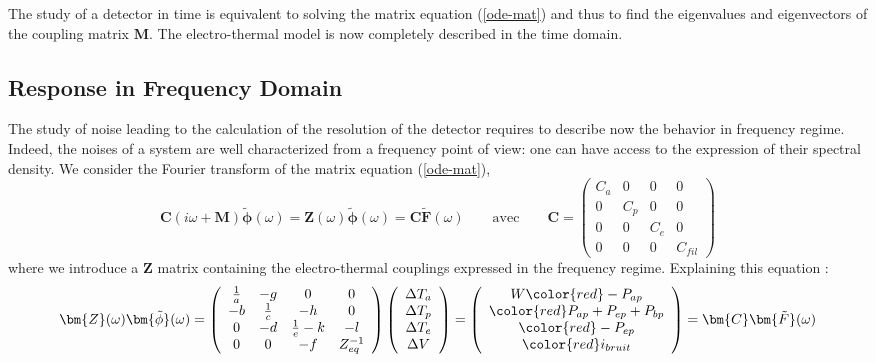 The study of a detector in time is equivalent to solving the matrix equation (\ref{ode-mat}) and thus to find the eigenvalues and eigenvectors of the coupling matrix $\bm{M}$. The electro-thermal model is now completely described in the time domain.


\subsection{Response in Frequency Domain}
\label{omega}

The study of noise leading to the calculation of the resolution of the detector requires to describe now the behavior in frequency regime. Indeed, the noises of a system are well characterized from a frequency point of view: one can have access to the expression of their spectral density.
We consider the Fourier transform of the matrix equation (\ref{ode-mat}),
\begin{equation}
\bm{C} (i\omega + \bm{M})  \bm{\tilde{\phi}}  (\omega) = \bm{Z} (\omega) \bm{\tilde{\phi}} (\omega)  = \bm{C} \bm{\tilde{F}} (\omega) \qquad \textrm{avec} \qquad \bm{C} = \left( \begin{array}{cccc}
 C_a&0&0&0 \\
0&C_p&0&0\\
0&0&C_e&0\\
0&0&0&C_{fil}
\end{array} \right)
\end{equation}
where we introduce a $\bm{Z}$ matrix containing the electro-thermal couplings expressed in the frequency regime. Explaining this equation :
\begin{equation}
\label{z-mat}
\bm{Z} (\omega) \bm{\tilde{\phi}} (\omega) =
\left( \begin{array}{cccc}
 \frac{1}{a}&-g&0&0 \\
-b&\frac{1}{c}&-h&0\\
0&-d&\frac{1}{e}-k&-l\\
0&0&-f&Z_{eq}^{-1}
\end{array} \right)
\left( \begin{array}{c}
\Delta T_a\\
\Delta T_p\\
\Delta T_e\\
\Delta V
\end{array} \right)
 =
\left( \begin{array}{c}
W\begingroup\color{red} - P_{ap}\endgroup\\
\begingroup\color{red}  P_{ap} + P_{ep} + P_{bp}\endgroup\\
\begingroup\color{red} - P_{ep}\endgroup\\
\begingroup\color{red}  i_{bruit} \endgroup
\end{array} \right)
=  \bm{C} \bm{\tilde{F}} (\omega)
\end{equation}
